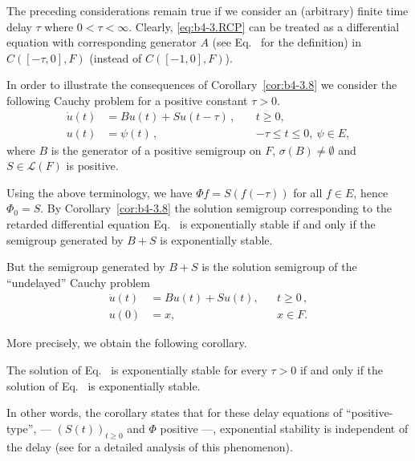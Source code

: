 The preceding considerations remain true if we consider an (arbitrary) finite time delay $\tau$ where $0 < \tau < \infty$. 
Clearly, \eqref{eq:b4-3.RCP} can be treated as a differential equation with corresponding generator $A$ (see Eq.~ for the definition) in $C([-\tau,0],F)$ (instead of\/ $C([-1,0],F)$).
\begin{example}\label{ex:b4-3.10}
	In order to illustrate the consequences of Corollary~\ref{cor:b4-3.8} we consider the  following Cauchy problem for a positive constant  $\tau > 0$.
	\begin{equation}\label{eq:b4-3.7}
		\begin{aligned}
		\dot{u}(t) &= Bu(t) + Su(t-\tau)\, , \ &&t \geq 0 ,\\
		u(t) &= \psi(t)\, , \ &&-\tau \leq t \leq 0  , \ \psi \in E ,
		\end{aligned}
	\end{equation}
	where $B$ is the generator of a positive semigroup on $F$, $\sigma(B) \neq \emptyset$ and $S \in \mathcal{L}(F)$ is positive.
	
	Using the above terminology, we have $\Phi f = S(f(-\tau))$ for all $f \in E$, hence $\Phi_{0} = S$. 
	By Corollary~\ref{cor:b4-3.8} the solution semigroup corresponding to the retarded differential equation Eq.~ is exponentially stable if and only if the semigroup generated by $B + S$ is exponentially stable.
	
	But the semigroup generated by $B + S$ is the solution semigroup of the \enquote{undelayed} Cauchy problem
	\begin{equation}\label{eq:b4-3.8}
	\begin{aligned}
		\dot{u}(t) &= Bu(t) + Su(t) , &&t \geq 0\, ,\\
		u(0)       &= x ,             &&x \in F.
	\end{aligned}
	\end{equation}
\end{example}
More precisely, we obtain the following corollary.
\begin{corollary*}
    The solution of Eq.~ is exponentially stable for every $\tau > 0$ if and only if the solution of Eq.~ is exponentially stable.
\end{corollary*}
In other words, the corollary states that for these delay equations of \enquote{positive-type}, 
--- $(S(t))_{t\geq0}$ and $\Phi$ positive ---, 
exponential stability is independent of the delay (see \textcite{kerscher:1986} for a detailed analysis of this phenomenon).
	
